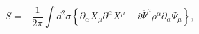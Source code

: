 \begin{equation}
S=-\frac{1}{2\pi}\int
d^{2}\sigma\left\{\partial_{\alpha}X_{\mu}\partial^{\alpha}X^{\mu}-i\overline{\Psi}^{\mu}\rho^{\alpha}\partial_{\alpha}\Psi_{\mu}\right\},
\end{equation}

